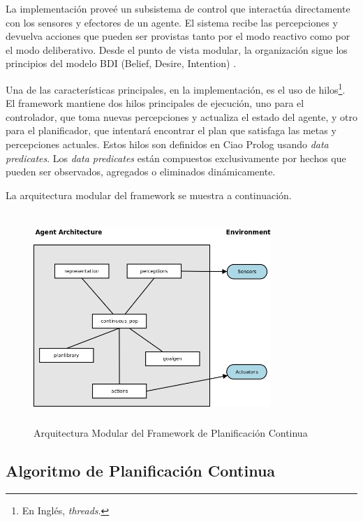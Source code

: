 La implementaci\'on prove\'e un subsistema de control que interact\'ua directamente
con los sensores y efectores de un agente. El sistema recibe las percepciones
y devuelva acciones que pueden ser provistas tanto por el modo
reactivo como por el modo deliberativo.
Desde el punto de vista modular, la organizaci\'on sigue
los principios del modelo BDI (Belief, Desire, 
Intention) \cite{gbraun:rao91a}. 

Una de las caracter\'isticas principales, en la implementaci\'on, 
es el uso de hilos\footnote{En Ingl\'es, \emph{threads}.}.
El framework mantiene dos hilos principales de ejecuci\'on,
uno para el controlador, que toma nuevas percepciones
y actualiza el estado del agente, y otro para el planificador,
que intentar\'a encontrar el plan que satisfaga las metas y
percepciones actuales.
Estos hilos son definidos en Ciao Prolog usando
\emph{data predicates}. Los \emph{data predicates}
est\'an compuestos exclusivamente
por hechos que pueden ser observados, agregados o eliminados
din\'amicamente.

La arquitectura modular del framework se muestra
a continuaci\'on. 


	\begin{figure}[h!]
                \centering
		\includegraphics[width=9cm,height=8cm]{arq_modular.png}
		\caption{Arquitectura Modular del Framework de
                  Planificaci\'on Continua}
		\label{framework:modules}
	\end{figure}



	\subsection{Algoritmo de Planificaci\'on Continua}
	
